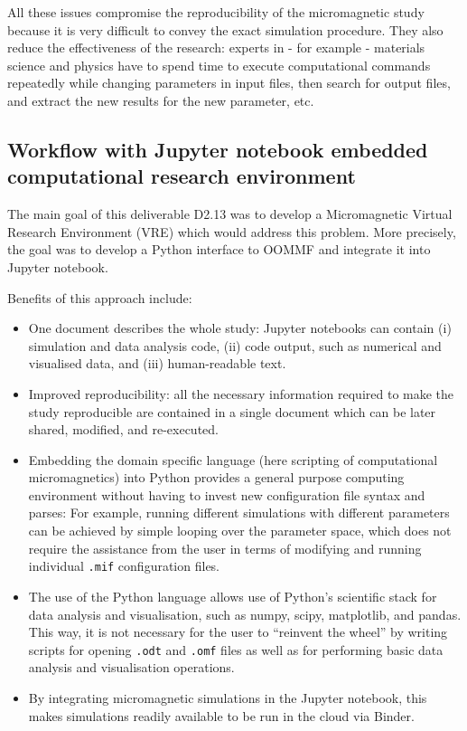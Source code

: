 \documentclass{deliverablereport}
\begin{document}
All these issues compromise the reproducibility of the micromagnetic
study because it is very difficult to convey the exact simulation
procedure. They also reduce the effectiveness of the research: experts
in - for example - materials science and physics have to spend time to
execute computational commands repeatedly while changing parameters in
input files, then search for output files, and extract the new results
for the new parameter, etc.

\subsection{Workflow with Jupyter notebook embedded computational
  research environment}

The main goal of this deliverable D2.13 was
to develop a Micromagnetic Virtual Research Environment (VRE) which
would address this problem. More precisely, the goal was to develop a
Python interface to OOMMF and integrate it into Jupyter
notebook.

Benefits of this approach include:
\begin{itemize}
\item One document describes the whole study: Jupyter notebooks can
  contain (i) simulation and data analysis code, (ii) code output,
  such as numerical and visualised data, and (iii) human-readable
  text.
\item Improved reproducibility: all the necessary
information required to make the study reproducible are contained in a
single document which can be later shared, modified, and
re-executed.
\item Embedding the domain specific language (here scripting of
  computational micromagnetics) into Python provides a general purpose
  computing environment without having to invest new configuration
  file syntax and parses: For example, running different simulations with
different parameters can be achieved by simple looping over the
parameter space, which does not require the assistance from the user
in terms of modifying and running individual \texttt{.mif}
configuration files.
\item The use of the Python language allows use of Python's scientific
stack for data analysis and visualisation, such as numpy, scipy,
matplotlib, and pandas. This way, it is not
necessary for the user to ``reinvent the wheel'' by writing scripts
for opening \texttt{.odt} and \texttt{.omf} files as well as for
performing basic data analysis and visualisation operations.
\item By integrating micromagnetic simulations in the Jupyter notebook, this
makes simulations readily available to be run in the cloud via
Binder.
\end{itemize}
\end{document}
